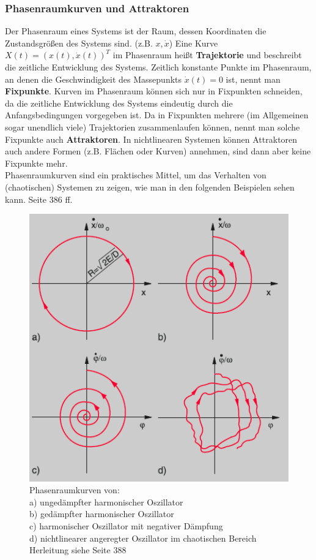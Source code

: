 \subsubsection{Phasenraumkurven und Attraktoren}
Der Phasenraum eines Systems ist der Raum, dessen Koordinaten die Zustandsgrößen des Systems sind. (z.B. $x, \dot{x}$) Eine Kurve $X(t) = (x(t), \dot{x}(t))^T$ im Phasenraum heißt \textbf{Trajektorie} und beschreibt die zeitliche Entwicklung des Systems. Zeitlich konstante Punkte im Phasenraum, an denen die Geschwindigkeit des Massepunkts $\dot{x}(t) = 0$  ist, nennt man \textbf{Fixpunkte}. Kurven im Phasenraum können sich nur in Fixpunkten schneiden, da die zeitliche Entwicklung des Systems eindeutig durch die Anfangsbedingungen vorgegeben ist. Da in Fixpunkten mehrere (im Allgemeinen sogar unendlich viele) Trajektorien zusammenlaufen können, nennt man solche Fixpunkte auch \textbf{Attraktoren}. In nichtlinearen Systemen können Attraktoren auch andere Formen (z.B. Flächen oder Kurven) annehmen, sind dann aber keine Fixpunkte mehr.
\\
Phasenraumkurven sind ein praktisches Mittel, um das Verhalten von (chaotischen) Systemen zu zeigen, wie man in den folgenden Beispielen sehen kann.\cite{troeder} Seite 386 ff.

\begin{figure}
\includegraphics[width=1.0\textwidth]{images/phasenraum1.png}
\caption{Phasenraumkurven von: \\a) ungedämpfter harmonischer Oszillator \\b) gedämpfter harmonischer Oszillator \\c) harmonischer Oszillator mit negativer Dämpfung \\d) nichtlinearer angeregter Oszillator im chaotischen Bereich \\Herleitung siehe \cite{troeder} Seite 388}
\end{figure}

